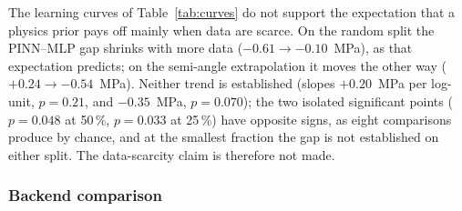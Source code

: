 The learning curves of Table~\ref{tab:curves} do not support the expectation that a physics prior pays off mainly when data are scarce. On the random split the PINN--MLP gap shrinks with more data ($-0.61\to-0.10$~MPa), as that expectation predicts; on the semi-angle extrapolation it moves the other way ($+0.24\to-0.54$~MPa). Neither trend is established (slopes $+0.20$~MPa per log-unit, $p=0.21$, and $-0.35$~MPa, $p=0.070$); the two isolated significant points ($p=0.048$ at 50\,\%, $p=0.033$ at 25\,\%) have opposite signs, as eight comparisons produce by chance, and at the smallest fraction the gap is not established on either split. The data-scarcity claim is therefore not made.

\subsubsection{Backend comparison}
\label{sec:res_backend}

